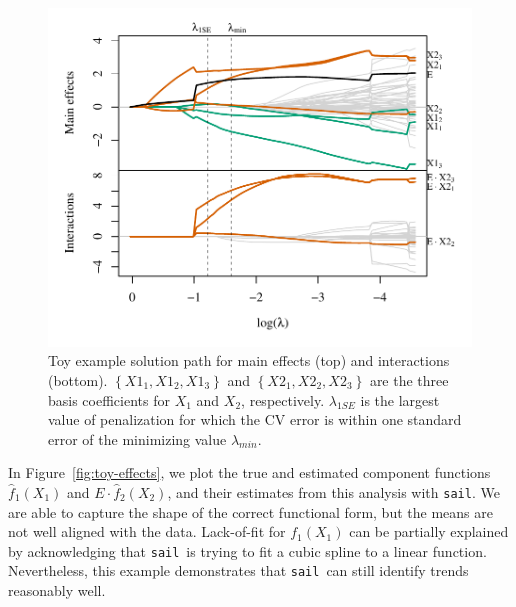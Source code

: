 \documentclass[12pt,letter]{article}\usepackage[]{graphicx}\usepackage[]{color}
\newenvironment{knitrout}{}{} %
\newcommand{\sail}{\texttt{sail}}
\begin{document}
\begin{knitrout}\scriptsize
{}\color{fgcolor}\begin{figure}[H]

{\centering \includegraphics[width=1\linewidth]{figure/toy-solution-path-1} 

}

\caption[Toy example solution path for main effects (top) and interactions (bottom)]{Toy example solution path for main effects (top) and interactions (bottom). $\left\lbrace X1_1, X1_2, X1_3 \right\rbrace$ and $\left\lbrace X2_1, X2_2, X2_3 \right\rbrace$ are the three basis coefficients for $X_1$ and $X_2$, respectively. $\lambda_{1SE}$ is the largest value of penalization for which the CV error is within one standard error of the minimizing value $\lambda_{min}$.}\label{fig:toy-solution-path}
\end{figure}


\end{knitrout}

In Figure~\ref{fig:toy-effects}, we plot the true and estimated component functions $\hat{f}_1(X_1)$ and $E \cdot \hat{f}_2(X_2)$, and their estimates from this analysis with \texttt{sail}. We are able to capture the shape of the correct functional form, but the means are not well aligned with the data. Lack-of-fit for $f_1(X_1)$ can be partially explained by acknowledging that \sail ~is trying to fit a cubic spline to a linear function. Nevertheless, this example demonstrates that \sail ~can still identify trends reasonably well.
\end{document}
